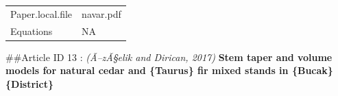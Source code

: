 \documentclass[]{article}
\begin{document}
\begin{longtable}[]{@{}ll@{}}
\begin{minipage}[t]{0.21\columnwidth}\raggedright
Paper.local.file\strut
\end{minipage} & \begin{minipage}[t]{0.73\columnwidth}\raggedright
navar.pdf\strut
\end{minipage}\tabularnewline
\begin{minipage}[t]{0.21\columnwidth}\raggedright
Equations\strut
\end{minipage} & \begin{minipage}[t]{0.73\columnwidth}\raggedright
NA\strut
\end{minipage}\tabularnewline
\bottomrule
\end{longtable}

\#\#Article ID 13 : \emph{(Ã--zÃ§elik and Dirican, 2017)} \textbf{Stem
taper and volume models for natural cedar and \{Taurus\} fir mixed
stands in \{Bucak\} \{District\}}
\end{document}
